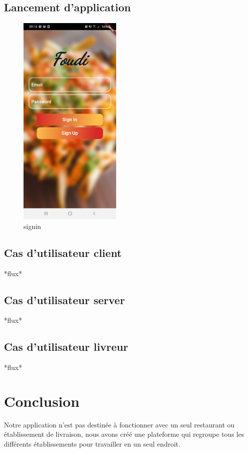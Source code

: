 \documentclass[french, a4paper, 12pt]{report}
\begin{document}
	\section{Lancement d'application} 
		\begin{figure}[!h]
  			\center
  			\includegraphics[width=5cm]{screenshots/signin.jpg}
  			\caption{signin}
  			\label{fig:signin}
		\end{figure}
		
	\newpage
	\section{Cas d'utilisateur client} *flux*
	\newpage
	\section{Cas d'utilisateur server} *flux*
	\newpage
	\section{Cas d'utilisateur livreur} *flux*

\newpage
\chapter*{Conclusion}
Notre application n'est pas destinée à fonctionner avec un seul restaurant ou établissement de livraison, nous avons créé une plateforme qui regroupe tous les différents établissements pour travailler en un seul endroit.\\
\end{document}

